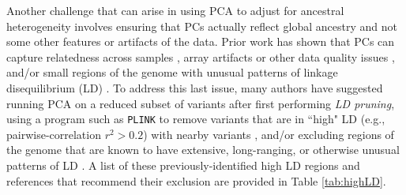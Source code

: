 \documentclass[12pt]{article}
\newcommand{\add}[1]{{\color{red}{[... #1 ...]}}}
\begin{document}
Another challenge that can arise in using PCA to adjust for ancestral heterogeneity involves ensuring that PCs actually reflect global ancestry and not some other features or artifacts of the data. 
Prior work has shown that PCs can capture relatedness across samples \citep{patterson2006, price2010, abdellaoui2013, conomos2015}, array artifacts or other data quality issues \citep{patterson2006, eigenstrat, price2010, weale2010}, and/or small regions of the genome with unusual patterns of linkage disequilibrium (LD) \citep{patterson2006, eigenstrat, wellcome2007, tian2008, price2008, price2010, weale2010, zou2010, laurie2010, abdellaoui2013, prive2020}. 
To address this last issue, many authors have suggested running PCA on a reduced subset of variants after first performing \textit{LD pruning}, using a program such as \texttt{PLINK} \citep{plink} to remove variants that are in ``high" LD (e.g., pairwise-correlation $r^2 > 0.2$) with nearby variants  \citep{wellcome2007, fellay2007, novembre2008, yu2008, nelson2008, anderson2010, weale2010, laurie2010, abdellaoui2013, zhang2013, conomos2015, reed2015, galinsky2016, conomos2016, daya2019}, and/or excluding regions of the genome that are known to have extensive, long-ranging, or otherwise unusual patterns of LD \citep{wellcome2007,  fellay2007, novembre2008, price2008, anderson2010, weale2010, raska2012, conomos2016}. 
A list of these previously-identified high LD regions and references that recommend their exclusion are provided in Table \ref{tab:highLD}.
\end{document}
